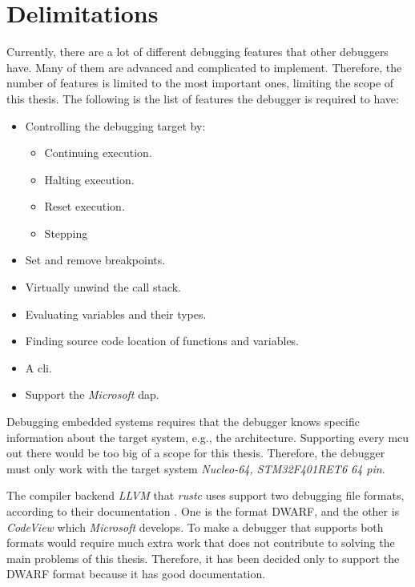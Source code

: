 \section{Delimitations}
\label{sec:delimitations}
Currently, there are a lot of different debugging features that other debuggers have.
Many of them are advanced and complicated to implement.
Therefore, the number of features is limited to the most important ones, limiting the scope of this thesis.
The following is the list of features the debugger is required to have:


\begin{itemize} \label{list:debuggerfeatures}
  \item Controlling the debugging target by:
  \begin{itemize}
    \item Continuing execution.
    \item Halting execution.
    \item Reset execution.
    \item Stepping
  \end{itemize}
  \item Set and remove breakpoints.
  \item Virtually unwind the call stack.
  \item Evaluating variables and their types.
  \item Finding source code location of functions and variables.
  \item A \acrfull{cli}.
  \item Support the \emph{Microsoft} \acrfull{dap}.
\end{itemize}


Debugging embedded systems requires that the debugger knows specific information about the target system, e.g., the architecture.
Supporting every \gls{mcu} out there would be too big of a scope for this thesis.
Therefore, the debugger must only work with the target system \emph{Nucleo-64, STM32F401RET6 64 pin}.


The compiler backend \emph{LLVM} that \emph{rustc} uses support two debugging file formats, according to their documentation \cite{llvm-dbs}.
One is the format \gls{DWARF}, and the other is \emph{CodeView} which \emph{Microsoft} develops.
To make a debugger that supports both formats would require much extra work that does not contribute to solving the main problems of this thesis.
Therefore, it has been decided only to support the \gls{DWARF} format because it has good documentation.


